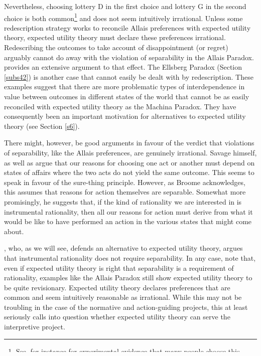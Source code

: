 Nevertheless, choosing lottery D in the first choice and lottery G in the second choice is both common\footnote{See, for instance \citet{Morrison1967} for experimental evidence that many people choose this way.} and does not seem intuitively irrational. Unless some redescription strategy works to reconcile Allais preferences with expected utility theory, expected utility theory must declare these preferences irrational. Redescribing the outcomes to take account of disappointment (or regret) arguably cannot do away with the violation of separability in the Allais Paradox. \citet{Weber1998} provides an extensive argument to that effect. The Ellsberg Paradox (Section \ref{subs42}) is another case that cannot easily be dealt with by redescription. These examples suggest that there are more problematic types of interdependence in value between outcomes in different states of the world that cannot be as easily reconciled with expected utility theory as the Machina Paradox. They have consequently been an important motivation for alternatives to expected utility theory (see Section \ref{s6}).

There might, however, be good arguments in favour of the verdict that violations of separability, like the Allais preferences, are genuinely irrational. Savage himself, as well as \citet{Broome1991} argue that our reasons for choosing one act or another must depend on states of affairs where the two acts do not yield the same outcome. This seems to speak in favour of the sure-thing principle. However, as Broome acknowledges, this assumes that reasons for action themselves are separable. Somewhat more promisingly, he suggests that, if the kind of rationality we are interested in is instrumental rationality, then all our reasons for action must derive from what it would be like to have performed an action in the various states that might come about.

\citet{Buchak2013}, who, as we will see, defends an alternative to expected utility theory, argues that instrumental rationality does not require separability. In any case, note that, even if expected utility theory is right that separability is a requirement of rationality, examples like the Allais Paradox still show expected utility theory to be quite revisionary. Expected utility theory declares preferences that are common and seem intuitively reasonable as irrational. While this may not be troubling in the case of the normative and action-guiding projects, this at least seriously calls into question whether expected utility theory can serve the interpretive project.

